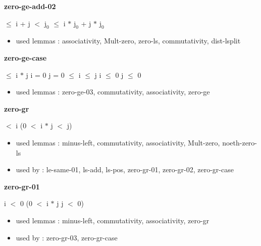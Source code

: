 \documentclass[a4paper]{article}
\begin{document}
\medskip

\bigskip

{\large\bf zero-ge-add-02}

\medskip

  $\le$ i + j  $<$ $\mbox{j}_{0}$  $\le$ i $*$ $\mbox{j}_{0}$ + j $*$ $\mbox{j}_{0}$

\begin{itemize}


\item       used lemmas  : associativity, Mult-zero, zero-ls, commutativity, dist-lsplit

\end{itemize}

\medskip

\bigskip

{\large\bf zero-ge-case}

\medskip

  $\le$ i $*$ j \Equiv i = 0 \Or j = 0  $\le$ i  $\le$ j \Or i $\le$ 0 \And j $\le$ 0

\begin{itemize}


\item       used lemmas  : zero-ge-03, commutativity, associativity, zero-ge

\end{itemize}

\medskip

\bigskip

{\large\bf zero-gr}

\medskip

  $<$ i \Imp (0 $<$ i $*$ j  $<$ j)

\begin{itemize}


\item       used lemmas  : minus-left, commutativity, associativity, Mult-zero, noeth-zero-ls
\item       used by      : le-same-01, ls-add, ls-pos, zero-gr-01, zero-gr-02, zero-gr-case

\end{itemize}

\medskip

\bigskip

{\large\bf zero-gr-01}

\medskip

 \Fol i $<$ 0 \Imp (0 $<$ i $*$ j \Equiv j $<$ 0)

\begin{itemize}


\item       used lemmas  : minus-left, commutativity, associativity, zero-gr
\item       used by      : zero-gr-03, zero-gr-case

\end{itemize}
\end{document}
